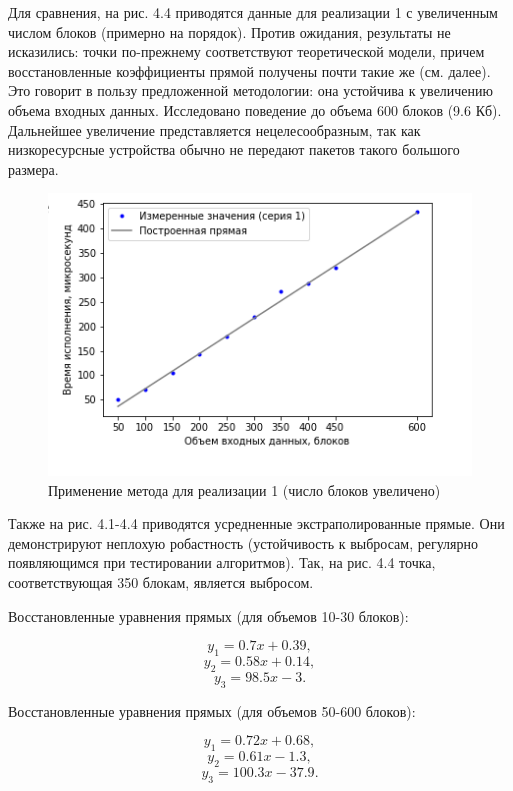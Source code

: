 Для сравнения, на рис. 4.4 приводятся данные для реализации 1 с увеличенным числом блоков (примерно на порядок). Против ожидания, результаты не исказились: точки по-прежнему соответствуют теоретической модели, причем восстановленные коэффициенты прямой получены почти такие же (см. далее). Это говорит в пользу предложенной методологии: она устойчива к увеличению объема входных данных. Исследовано поведение до объема 600 блоков (9.6 Кб). Дальнейшее увеличение представляется нецелесообразным, так как низкоресурсные устройства обычно не передают пакетов такого большого размера.

\begin{figure}[ht!] 
	\includegraphics [scale=0.7] {my_folder/plots//plot4}
	\centering
	\caption{Применение метода для реализации 1 (число блоков увеличено)} 
\end{figure}

Также на рис. 4.1-4.4 приводятся усредненные экстраполированные прямые. Они демонстрируют неплохую робастность (устойчивость к выбросам, регулярно появляющимся при тестировании алгоритмов). Так, на рис. 4.4 точка, соответствующая 350 блокам, является выбросом.

Восстановленные уравнения прямых (для объемов 10-30 блоков):

\begin{equation}
y_1 = 0.7x + 0.39,
\end{equation}
\begin{equation}
y_2 = 0.58x + 0.14,
\end{equation}
\begin{equation}
y_3 = 98.5x - 3.
\end{equation}

Восстановленные уравнения прямых (для объемов 50-600 блоков):

\begin{equation}
y_1 = 0.72x + 0.68,
\end{equation}
\begin{equation}
y_2 = 0.61x - 1.3,
\end{equation}
\begin{equation}
y_3 = 100.3x - 37.9.
\end{equation}

